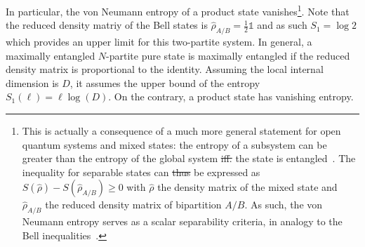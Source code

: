 \documentclass{svmono}
\providecommand{\DIFaddtex}[1]{{\protect\color{blue}\uwave{#1}}} %
\providecommand{\DIFdeltex}[1]{{\protect\color{red}\sout{#1}}}                      %
\providecommand{\DIFaddbegin}{} %
\providecommand{\DIFaddend}{} %
\providecommand{\DIFdelbegin}{} %
\providecommand{\DIFdelend}{} %
\providecommand{\DIFadd}[1]{\texorpdfstring{\DIFaddtex{#1}}{#1}} %
\providecommand{\DIFdel}[1]{\texorpdfstring{\DIFdeltex{#1}}{}} %
\newcommand{\DIFscaledelfig}{0.5}
\newlength{\DIFdelgraphicswidth} %
\newlength{\DIFdelgraphicsheight} %
\newcommand{\DIFaddincludegraphics}[2][]{{\color{blue}\fbox{\DIFOincludegraphics[#1]{#2}}}} %
\newcommand{\DIFdelincludegraphics}[2][]{%
\sbox{\DIFdelgraphicsbox}{\DIFOincludegraphics[#1]{#2}}%
\settoboxwidth{\DIFdelgraphicswidth}{\DIFdelgraphicsbox} %
\settoboxtotalheight{\DIFdelgraphicsheight}{\DIFdelgraphicsbox} %
\scalebox{\DIFscaledelfig}{%
\parbox[b]{\DIFdelgraphicswidth}{\usebox{\DIFdelgraphicsbox}\\[-\baselineskip] \rule{\DIFdelgraphicswidth}{0em}}\llap{\resizebox{\DIFdelgraphicswidth}{\DIFdelgraphicsheight}{%
\setlength{\unitlength}{\DIFdelgraphicswidth}%
\begin{picture}(1,1)%
\thicklines\linethickness{2pt} %
{\color[rgb]{1,0,0}\put(0,0){\framebox(1,1){}}}%
{\color[rgb]{1,0,0}\put(0,0){\line( 1,1){1}}}%
{\color[rgb]{1,0,0}\put(0,1){\line(1,-1){1}}}%
\end{picture}%
}\hspace*{3pt}}} %
} %
\DeclareRobustCommand{\DIFaddbegin}{\DIFOaddbegin \let\includegraphics\DIFaddincludegraphics} %
\DeclareRobustCommand{\DIFaddend}{\DIFOaddend \let\includegraphics\DIFOincludegraphics} %
\DeclareRobustCommand{\DIFdelbegin}{\DIFOdelbegin \let\includegraphics\DIFdelincludegraphics} %
\DeclareRobustCommand{\DIFdelend}{\DIFOaddend \let\includegraphics\DIFOincludegraphics} %
\begin{document}
In particular, the von Neumann entropy of a product state vanishes\footnote{This is actually a consequence of a much more general statement for open quantum systems and mixed states: the entropy of a subsystem can be greater than the entropy of the global system \DIFdelbegin \DIFdel{iff. }\DIFdelend \DIFaddbegin \DIFadd{if and only if }\DIFaddend the state is entangled~\cite{Horodecki1994}.
The inequality for separable states can \DIFdelbegin \DIFdel{thus }\DIFdelend be expressed as $S(\hat\rho)-S(\hat\rho_{A/B})\geq0$ with $\hat\rho$ the density matrix of the mixed state and $\hat\rho_{A/B}$ the reduced density matrix of bipartition $A/B$.
As such, the von Neumann entropy serves as a scalar separability criteria, in analogy to the Bell inequalities~\cite{Horodecki2006}.}.
Note that the reduced density matriy of the Bell states is $\hat\rho_{A/B}=\frac12\mathbb1$ and as such \DIFdelbegin \DIFdel{$S_1=\log2$ }\DIFdelend \DIFaddbegin \DIFadd{$S_1=\ln2$ }\DIFaddend which provides an upper limit for this two-partite system.
In general, a maximally entangled $N$-partite pure state is maximally entangled if the reduced density matrix is proportional to the identity.
Assuming the local internal dimension is $D$, it assumes the upper bound of the entropy \DIFdelbegin \DIFdel{$S_1(\ell)=\ell\log(D)$}\DIFdelend \DIFaddbegin \DIFadd{$S_1(\ell)=\ell\ln(D)$}\DIFaddend .
On the contrary, a product state has vanishing entropy.
\end{document}
